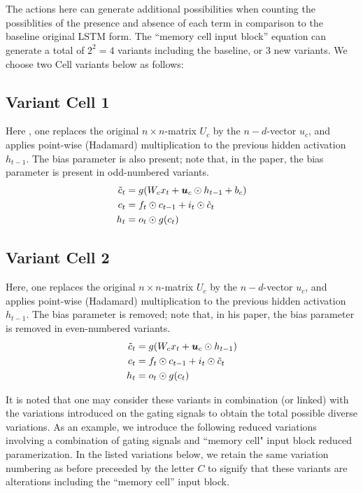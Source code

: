 \documentclass{article}
\begin{document}
{{{\\
\\
The actions here can generate additional possibilities when counting the possiblities of the presence and absence of each term in comparison to the baseline original LSTM form. The ``memory cell input block'' equation can generate a total of $2^2=4$ variants including the baseline, or 3 new variants. We choose two Cell variants below as follows:

\subsection{Variant Cell 1}
Here , one replaces the original $n \times n$-matrix $U_c$ by the $n-d$-vector $u_c$, and applies point-wise (Hadamard) multiplication to the previous hidden activation $h_{t-1}$. The bias parameter is also present; note that, in the paper, the bias parameter is present in odd-numbered variants.
\begin{align}
	\label{eqn:2000}	\tilde{c}_t &= g(W_c x_t +{\bm{u}}_{c} \odot h_{t-1} + b_c)\\
	\label{eqn:3000}	 c_t &= f_t \odot c_{t-1} + i_t \odot \tilde{c}_t\\
	\label{eqn:4000}	h_t &= o_t \odot g(c_t)
\end{align}

\subsection{Variant Cell 2}
Here, one replaces the original $n \times n$-matrix $U_c$ by the $n-d$-vector $u_c$, and applies point-wise (Hadamard) multiplication to the previous hidden activation $h_{t-1}$. The bias parameter is removed; note that, in his paper, the bias parameter is removed in even-numbered variants.
\begin{align}
	\label{eqn:2000}	\tilde{c}_t &= g(W_c x_t + {\bm{u}}_{c} \odot h_{t-1})\\
	\label{eqn:3000}	 c_t &= f_t \odot c_{t-1} + i_t \odot \tilde{c}_t\\
	\label{eqn:4000}	h_t &= o_t \odot g(c_t)
\end{align}

 It is noted that one may consider these variants in combination (or linked) with the variations introduced on the gating signals to obtain the total possible diverse variations. As an example, we introduce the following reduced variations involving a combination of gating signals and ``memory cell" input block reduced paramerization. In the listed variations below, we retain the same variation numbering as before preceeded by the letter $C$ to signify that these variants are alterations including the ``memory cell''  input block.

}}}
\end{document}
